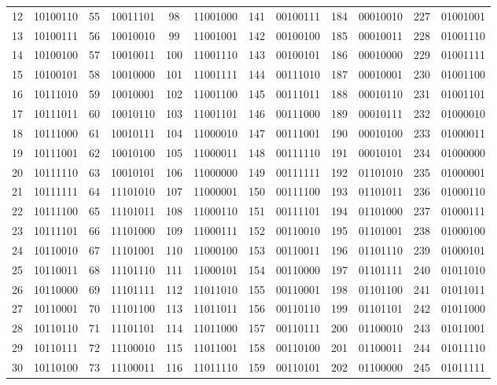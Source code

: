 \documentclass[conference,onecolumn,12pt]{IEEEtran}
\numberwithin{equation}{subsection}
\begin{document}
\begin{itemize}
\begin{table}[h!]
\begin{tabular}{cccccccccccc}
12 & 10100110 & 55 & 10011101 & 98 & 11001000 & 141 & 00100111 & 184 & 00010010 & 227 & 01001001 \\
13 & 10100111 & 56 & 10010010 & 99 & 11001001 & 142 & 00100100 & 185 & 00010011 & 228 & 01001110 \\
14 & 10100100 & 57 & 10010011 & 100 & 11001110 & 143 & 00100101 & 186 & 00010000 & 229 & 01001111 \\
15 & 10100101 & 58 & 10010000 & 101 & 11001111 & 144 & 00111010 & 187 & 00010001 & 230 & 01001100 \\
16 & 10111010 & 59 & 10010001 & 102 & 11001100 & 145 & 00111011 & 188 & 00010110 & 231 & 01001101 \\
17 & 10111011 & 60 & 10010110 & 103 & 11001101 & 146 & 00111000 & 189 & 00010111 & 232 & 01000010 \\
18 & 10111000 & 61 & 10010111 & 104 & 11000010 & 147 & 00111001 & 190 & 00010100 & 233 & 01000011 \\
19 & 10111001 & 62 & 10010100 & 105 & 11000011 & 148 & 00111110 & 191 & 00010101 & 234 & 01000000 \\
20 & 10111110 & 63 & 10010101 & 106 & 11000000 & 149 & 00111111 & 192 & 01101010 & 235 & 01000001 \\
21 & 10111111 & 64 & 11101010 & 107 & 11000001 & 150 & 00111100 & 193 & 01101011 & 236 & 01000110 \\
22 & 10111100 & 65 & 11101011 & 108 & 11000110 & 151 & 00111101 & 194 & 01101000 & 237 & 01000111 \\
23 & 10111101 & 66 & 11101000 & 109 & 11000111 & 152 & 00110010 & 195 & 01101001 & 238 & 01000100 \\
24 & 10110010 & 67 & 11101001 & 110 & 11000100 & 153 & 00110011 & 196 & 01101110 & 239 & 01000101 \\
25 & 10110011 & 68 & 11101110 & 111 & 11000101 & 154 & 00110000 & 197 & 01101111 & 240 & 01011010 \\
26 & 10110000 & 69 & 11101111 & 112 & 11011010 & 155 & 00110001 & 198 & 01101100 & 241 & 01011011 \\
27 & 10110001 & 70 & 11101100 & 113 & 11011011 & 156 & 00110110 & 199 & 01101101 & 242 & 01011000 \\
28 & 10110110 & 71 & 11101101 & 114 & 11011000 & 157 & 00110111 & 200 & 01100010 & 243 & 01011001 \\
29 & 10110111 & 72 & 11100010 & 115 & 11011001 & 158 & 00110100 & 201 & 01100011 & 244 & 01011110 \\
30 & 10110100 & 73 & 11100011 & 116 & 11011110 & 159 & 00110101 & 202 & 01100000 & 245 & 01011111 \\

\end{tabular}
\end{table}
\end{itemize}
\end{document}
